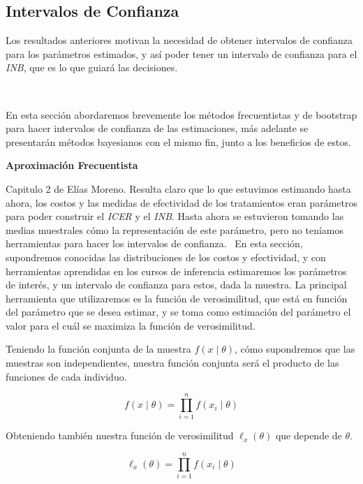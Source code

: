 \documentclass{article}
\begin{document}
\subsection{Intervalos de Confianza}

Los resultados anteriores motivan la necesidad de obtener intervalos de confianza para los parámetros estimados, y así poder tener un intervalo de confianza para el \textit{INB}, que es lo que guiará las decisiones.

\

En esta sección abordaremos brevemente los métodos frecuentistas y de bootstrap para hacer intervalos de confianza de las estimaciones, más adelante se presentarán métodos bayesianos con el mismo fin, junto a los beneficios de estos.


\begin{center}
    \textbf{Aproximación Frecuentista}
\end{center}

Capitulo 2 de Elías Moreno.
Resulta claro que lo que estuvimos estimando hasta ahora, los costos y las medidas de efectividad de los tratamientos eran parámetros para poder construir el \textit{ICER} y el \textit{INB}. Hasta ahora se estuvieron tomando las medias muestrales cómo la representación de este parámetro, pero no teníamos herramientas para hacer los intervalos de confianza.
\
En esta sección, supondremos conocidas las distribuciones de los costos y efectividad, y con herramientas aprendidas en los cursos de inferencia estimaremos los parámetros de interés, y un intervalo de confianza para estos, dada la muestra.
La principal herramienta que utilizaremos es la función de verosimilitud, que está en función del parámetro que se desea estimar, y se toma como estimación del parámetro el valor para el cuál se maximiza la función de verosimilitud.

Teniendo la función conjunta de la muestra $f(x\mid \theta)$, cómo supondremos que las muestras son independientes, nuestra función conjunta será el producto de las funciones de cada individuo.

\begin{equation}
    f(x\mid \theta) = \prod_{i=1}^n f(x_i\mid \theta)
\end{equation}

Obteniendo también nuestra función de verosimilitud $\ell_x(\theta)$ que depende de $\theta$.

\begin{equation}
    \ell_x(\theta) = \prod_{i=1}^n f(x_i\mid \theta)
\end{equation}
\end{document}
